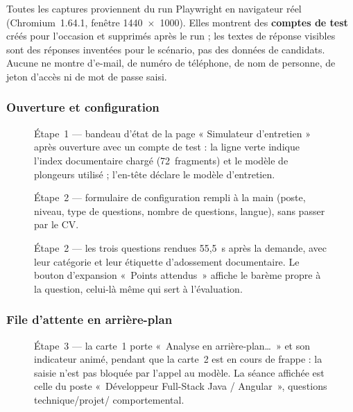 Toutes les captures proviennent du run Playwright en navigateur réel
(Chromium~1.64.1, fenêtre 1440~$\times$~1000). Elles montrent des
\textbf{comptes de test} créés pour l'occasion et supprimés après le run ; les
textes de réponse visibles sont des réponses inventées pour le scénario, pas des
données de candidats. Aucune ne montre d'e-mail, de numéro de téléphone, de nom
de personne, de jeton d'accès ni de mot de passe saisi.

\subsubsection{Ouverture et configuration}

\begin{figure}[H]\centering{}
\caption{Étape~1 --- bandeau d'état de la page « Simulateur d'entretien » après
ouverture avec un compte de test : la ligne verte indique l'index documentaire
chargé (72~fragments) et le modèle de plongeurs utilisé ; l'en-tête déclare le
modèle d'entretien.}
\end{figure}

\begin{figure}[H]\centering{}
\caption{Étape~2 --- formulaire de configuration rempli à la main (poste, niveau,
type de questions, nombre de questions, langue), sans passer par le CV.}
\end{figure}

\begin{figure}[H]\centering{}
\caption{Étape~2 --- les trois questions rendues 55,5~s après la demande, avec
leur catégorie et leur étiquette d'adossement documentaire. Le bouton
d'expansion «~Points attendus~» affiche le barème propre à la question, celui-là
même qui sert à l'évaluation.}
\end{figure}

\subsubsection{File d'attente en arrière-plan}

\begin{figure}[H]\centering{}
\caption{Étape~3 --- la carte~1 porte «~Analyse en arrière-plan\dots~» et son
indicateur animé, pendant que la carte~2 est en cours de frappe : la saisie
n'est pas bloquée par l'appel au modèle. La séance affichée est celle du poste
«~Développeur Full-Stack Java / Angular~», questions technique/projet/
comportemental.}
\end{figure}

